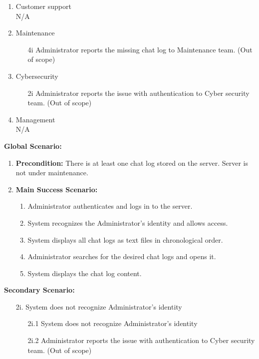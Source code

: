 \documentclass[]{article}
\begin{document}
\begin{enumerate}[{\bf BE1.}]
\begin{enumerate}[{\bf BE8.}]
\begin{enumerate}[{\bf VP1.}]
            \item Customer support \\
	            N/A
            \item Maintenance \\
	            \begin{enumerate}
                        \item[4i] Administrator reports the missing chat log to Maintenance team. (Out of scope)
                    \end{enumerate}
            \item Cybersecurity \\
            	\begin{enumerate}
                        \item[2i] Administrator reports the issue with authentication to Cyber security team. (Out of scope)
                \end{enumerate}
            \item Management \\
            N/A \\
		\end{enumerate}
		{\bf Global Scenario:}\\
        \begin{enumerate}[{  }]
            \item \textbf{Precondition:} There is at least one chat log stored on the server. Server is not under maintenance.
            \item \textbf{Main Success Scenario:}
            \begin{enumerate}[{  1.}]
                    \item Administrator authenticates and logs in to the server. 
		    \item System recognizes the Administrator’s identity and allows access.  
                    \item System displays all chat logs as text files in chronological order. 
                    \item Administrator searches for the desired chat logs and opens it. 
                    \item System displays the chat log content.  
            \end{enumerate}
        \end{enumerate}
	        \textbf{Secondary Scenario:}
                \begin{enumerate}
		
                    \item[2i.] System does not recognize Administrator’s identity 
                    \begin{enumerate}
                        \item[2i.1] System does not recognize Administrator’s identity
                        \item[2i.2] Administrator reports the issue with authentication to Cyber security team. (Out of scope)
                    \end{enumerate}
		    

\end{enumerate}
\end{enumerate}
\end{enumerate}
\end{document}
